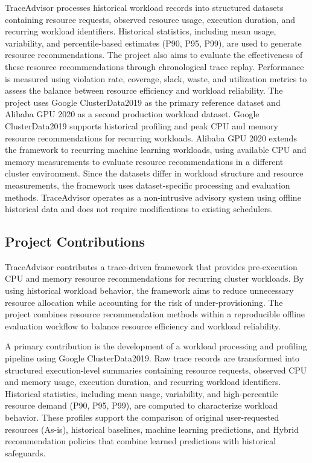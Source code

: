 \documentclass{IEEEtran}
\begin{document}
TraceAdvisor processes historical workload records into structured datasets containing resource requests, observed resource usage, execution duration, and recurring workload identifiers. Historical statistics, including mean usage, variability, and percentile-based estimates (P90, P95, P99), are used to generate resource recommendations. The project also aims to evaluate the effectiveness of these resource recommendations through chronological trace replay. Performance is measured using violation rate, coverage, slack, waste, and utilization metrics to assess the balance between resource efficiency and workload reliability. The project uses Google ClusterData2019 as the primary reference dataset and Alibaba GPU 2020 as a second production workload dataset. Google ClusterData2019 supports historical profiling and peak CPU and memory resource recommendations for recurring workloads. Alibaba GPU 2020 extends the framework to recurring machine learning workloads, using available CPU and memory measurements to evaluate resource recommendations in a different cluster environment. Since the datasets differ in workload structure and resource measurements, the framework uses dataset-specific processing and evaluation methods. TraceAdvisor operates as a non-intrusive advisory system using offline historical data and does not require modifications to existing schedulers.


\subsection{Project Contributions}

TraceAdvisor contributes a trace-driven framework that provides pre-execution CPU and memory resource recommendations for recurring cluster workloads. By using historical workload behavior, the framework aims to reduce unnecessary resource allocation while accounting for the risk of under-provisioning. The project combines resource recommendation methods within a reproducible offline evaluation workflow to balance resource efficiency and workload reliability.

A primary contribution is the development of a workload processing and profiling pipeline using Google ClusterData2019. Raw trace records are transformed into structured execution-level summaries containing resource requests, observed CPU and memory usage, execution duration, and recurring workload identifiers. Historical statistics, including mean usage, variability, and high-percentile resource demand (P90, P95, P99), are computed to characterize workload behavior. These profiles support the comparison of original user-requested resources (As-is), historical baselines, machine learning predictions, and Hybrid recommendation policies that combine learned predictions with historical safeguards.
\end{document}
